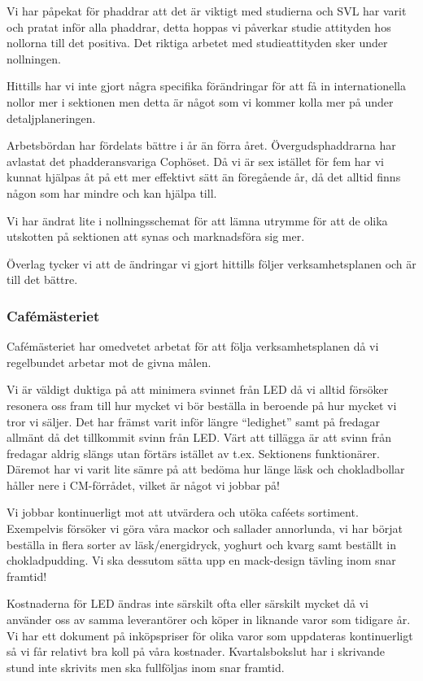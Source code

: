 \documentclass[../_main/handlingar.tex]{subfiles}
\begin{document}
Vi har påpekat för phaddrar att det är viktigt med studierna och SVL har varit och pratat inför alla phaddrar, detta hoppas vi påverkar studie attityden hos nollorna till det positiva. Det riktiga arbetet med studieattityden sker under nollningen.

Hittills har vi inte gjort några specifika förändringar för att få in internationella nollor mer i sektionen men detta är något som vi kommer kolla mer på under detaljplaneringen.

Arbetsbördan har fördelats bättre i år än förra året. Övergudsphaddrarna har avlastat det phadderansvariga Cophöset. Då vi är sex istället för fem har vi kunnat hjälpas åt på ett mer effektivt sätt än föregående år, då det alltid finns någon som har mindre och kan hjälpa till.

Vi har ändrat lite i nollningsschemat för att lämna utrymme för att de olika utskotten på sektionen att synas och marknadsföra sig mer.

Överlag tycker vi att de ändringar vi gjort hittills följer verksamhetsplanen och är till det bättre.

\subsubsection*{Cafémästeriet}
Cafémästeriet har omedvetet arbetat för att följa verksamhetsplanen då vi regelbundet arbetar mot de givna målen.

Vi är väldigt duktiga på att minimera svinnet från LED då vi alltid försöker resonera oss fram till hur mycket vi bör beställa in beroende på hur mycket vi tror vi säljer. Det har främst varit inför längre “ledighet” samt på fredagar allmänt då det tillkommit svinn från LED. Värt att tillägga är att svinn från fredagar aldrig slängs utan förtärs istället av t.ex. Sektionens funktionärer. Däremot har vi varit lite sämre på att bedöma hur länge läsk och chokladbollar håller nere i CM-förrådet, vilket är något vi jobbar på!

Vi jobbar kontinuerligt mot att utvärdera och utöka caféets sortiment. Exempelvis försöker vi göra våra mackor och sallader annorlunda, vi har börjat beställa in flera sorter av läsk/energidryck, yoghurt och kvarg samt beställt in chokladpudding. Vi ska dessutom sätta upp en mack-design tävling inom snar framtid!

Kostnaderna för LED ändras inte särskilt ofta eller särskilt mycket då vi använder oss av samma leverantörer och köper in liknande varor som tidigare år. Vi har ett dokument på inköpspriser för olika varor som uppdateras kontinuerligt så vi får relativt bra koll på våra kostnader. Kvartalsbokslut har i skrivande stund inte skrivits men ska fullföljas inom snar framtid.
\end{document}
